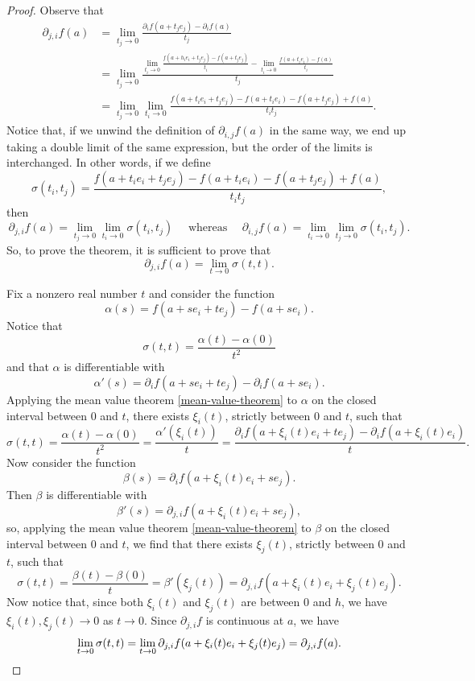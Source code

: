 \begin{proof}
	Observe that
	\[ \begin{aligned} \partial_{j,i} f(a) &= \lim_{t_j \to 0} \frac{\partial_i f(a + t_j e_j) - \partial_i f(a)}{t_j} \\
	&= \lim_{t_j \to 0} \frac{ \displaystyle \lim_{t_i \to 0} \frac{f(a + h_i e_i + t_j e_j) - f(a + t_j e_j)}{t_i} - \lim_{t_i \to  0} \frac{f(a + t_i e_i) - f(a)}{t_i} }{t_j} \\
	&= \lim_{t_j \to 0} \lim_{t_i \to 0} \frac{f(a + t_i e_i + t_j e_j) - f(a+t_i e_i) - f(a + t_j e_j) + f(a)}{t_i t_j}. \end{aligned} \]
	Notice that, if we unwind the definition of $\partial_{i,j} f(a)$ in the same way, we end up taking a double limit of the same expression, but the order of the limits is interchanged. In other words, if we define
	\[ \sigma(t_i, t_j) = \frac{f(a + t_i e_i + t_j e_j) - f(a+t_i e_i) - f(a + t_j e_j) + f(a)}{t_i t_j},  \]
	then
	\[ \partial_{j,i} f(a) = \lim_{t_j \to 0} \lim_{t_i \to 0} \sigma(t_i, t_j) \quad \text{ whereas } \quad \partial_{i,j}f(a) = \lim_{t_i \to 0} \lim_{t_j \to 0} \sigma(t_i, t_j). \]
	So, to prove the theorem, it is sufficient to prove that
	\[ \partial_{j,i} f(a) = \lim_{t \to 0} \sigma(t,t). \]
	
	Fix a nonzero real number $t$ and consider the function
	\[ \alpha(s) = f(a + se_i + te_j) - f(a + se_i). \]
	Notice that
	\[ \sigma(t,t) = \frac{\alpha(t)-\alpha(0)}{t^2} \]
	and that $\alpha$ is differentiable with \[ \alpha'(s) = \partial_i f(a + se_i + te_j) - \partial_i f(a + se_i). \]
	Applying the mean value theorem \ref{mean-value-theorem} to $\alpha$ on the closed interval between 0 and $t$, there exists $\xi_i(t)$, strictly between 0 and $t$, such that
	\[ \sigma(t,t) = \frac{\alpha(t) - \alpha(0)}{t^2} = \frac{\alpha'(\xi_i(t))}{t} = \frac{\partial_i f(a + \xi_i(t) e_i + te_j) - \partial_i f(a + \xi_i(t) e_i)}{t}. \]
	Now consider the function 
	\[ \beta(s) = \partial_i f(a + \xi_i(t) e_i + se_j). \]
	Then $\beta$ is differentiable with
	\[ \beta'(s) = \partial_{j,i} f(a + \xi_i(t) e_i + se_j), \]
	so, applying the mean value theorem \ref{mean-value-theorem} to $\beta$ on the closed interval between 0 and $t$, we find that there exists $\xi_j(t)$, strictly between 0 and $t$, such that
	\[ \sigma(t,t) = \frac{\beta(t) - \beta(0)}{t} = \beta'(\xi_j(t)) = \partial_{j,i} f(a + \xi_i(t) e_i + \xi_j(t) e_j). \]
	Now notice that, since both $\xi_i(t)$ and $\xi_j(t)$ are between 0 and $h$, we have $\xi_i(t), \xi_j(t) \to 0$ as $t \to 0$. Since $\partial_{j,i} f$ is continuous at $a$, we have
	\[ \lim_{t \to 0} \sigma(t,t) = \lim_{t \to 0} \partial_{j,i} f (a + \xi_i(t)e_i + \xi_j(t)e_j) = \partial_{j,i} f(a). \qedhere \]
\end{proof}

